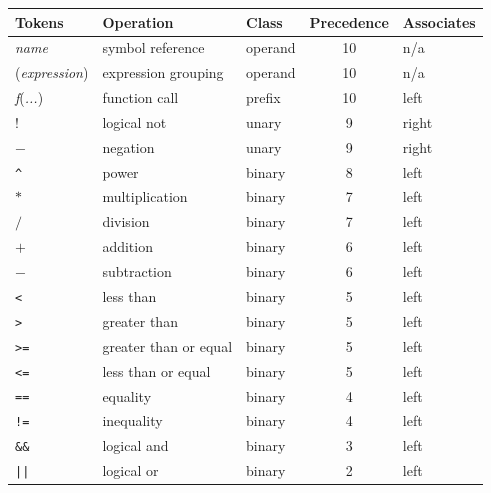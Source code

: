 \documentclass{cekarticle}
\begin{document}
\begin{table}[tbh]
  \vspace*{8pt}
  \begin{center}
    \begin{tabular}{lllcl}
      \toprule
      \textbf{Tokens} & \textbf{Operation} & \textbf{Class} & \textbf{Precedence} & \textbf{Associates} \\
      \midrule
      \emph{name} & symbol reference & operand & 10 & n/a \\
      (\emph{expression}) & expression grouping & operand & 10 & n/a\\
      \emph{f}(\emph{...}) & function call & prefix & 10 & left\\
      \color{red} $!$ & \color{red} logical not & \color{red} unary & \color{red} 9 & \color{red} right\\
      $-$ & negation & unary & 9 & right\\
      \verb|^| & power & binary & 8 & left \\
      $*$ & multiplication & binary & 7 & left\\
      $/$ & division & binary & 7 & left\\
      $+$ & addition & binary & 6 & left\\
      $-$ & subtraction & binary & 6 & left\\
      \color{red} \verb|<| & \color{red} less than & \color{red} binary & \color{red} 5 & \color{red} left\\
      \color{red} \verb|>| & \color{red} greater than & \color{red} binary & \color{red} 5 & \color{red} left\\
      \color{red} \verb|>=| & \color{red} greater than or equal & \color{red} binary & \color{red} 5 & \color{red} left\\
      \color{red} \verb|<=| & \color{red} less than or equal & \color{red} binary & \color{red} 5 & \color{red} left\\
      \color{red} \verb|==| & \color{red} equality & \color{red} binary & \color{red} 4 & \color{red} left\\
      \color{red} \verb|!=| & \color{red} inequality & \color{red} binary & \color{red} 4 & \color{red} left\\
      \color{red} \verb|&&| & \color{red} logical and & \color{red} binary & \color{red} 3 & \color{red} left\\
      \color{red} \verb+||+ & \color{red} logical or & \color{red} binary & \color{red} 2 & \color{red} left \\

\end{tabular}
\end{center}
\end{table}
\end{document}
